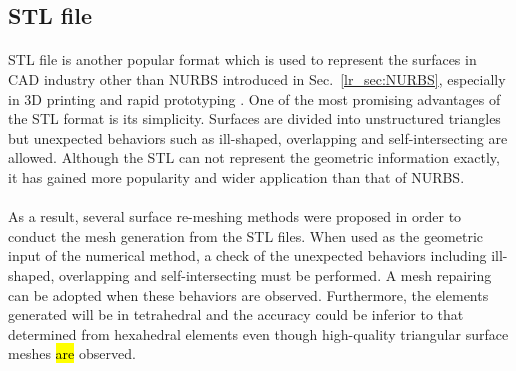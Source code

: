 \subsection{STL file}
\label{lr_sec:stl}
\paragraph{}
STL file is another popular format which is used to represent the surfaces in CAD industry other than NURBS introduced in Sec.~\ref{lr_sec:NURBS}, especially in 3D printing and rapid prototyping \citep{Rengier2010,doi:10.1080/10426910902997571}.
One of the most promising advantages of the STL format is its simplicity.
Surfaces are divided into unstructured triangles but unexpected behaviors such as ill-shaped, overlapping and self-intersecting are allowed.
Although the STL can not represent the geometric information exactly, it has gained more popularity and wider application than that of NURBS.

\paragraph{}
As a result, several surface re-meshing methods \citep{BECHET20021,Wang2007227} were proposed in order to conduct the mesh generation from the STL files.
When used as the geometric input of the numerical method, a check of the unexpected behaviors including ill-shaped, overlapping and self-intersecting must be performed.
A mesh repairing \citep{Attene:2013:PMR:2431211.2431214} can be adopted when these behaviors are observed.
Furthermore, the elements generated will be in tetrahedral and the accuracy could be inferior to that determined from hexahedral elements even though high-quality triangular surface meshes \hl{are} observed.
